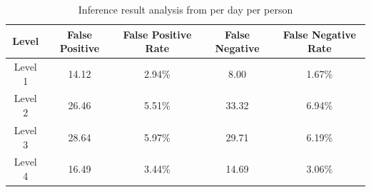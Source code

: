 \begin{table}[h]
\centering
\caption{Inference result analysis from per day per person}
\label{tab:fpfn}
\begin{tabular}{|c|c|c|c|c|}
\hline
\textbf{Level} & \textbf{False Positive} & \textbf{False Positive Rate} & \textbf{False Negative} & \textbf{False Negative Rate} \\ \hline
Level 1        & 14.12                   & 2.94\%                       & 8.00                    & 1.67\%                       \\ \hline
Level 2        & 26.46                   & 5.51\%                       & 33.32                   & 6.94\%                       \\ \hline
Level 3        & 28.64                   & 5.97\%                       & 29.71                   & 6.19\%                       \\ \hline
Level 4        & 16.49                   & 3.44\%                       & 14.69                   & 3.06\%                       \\ \hline
\end{tabular}
\end{table}


